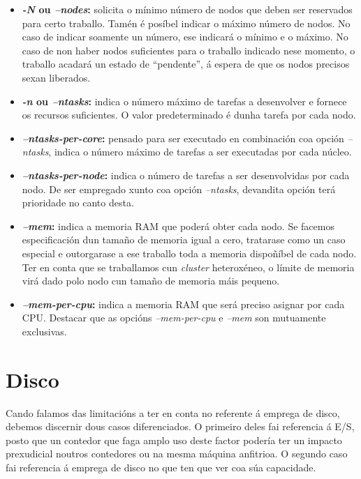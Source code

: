 \begin{itemize}
    \item \textbf{\textit{-N} ou \textit{--nodes}:} solicita o mínimo número de nodos que deben ser reservados para certo traballo. Tamén é posíbel indicar o máximo número de nodos. No caso de indicar soamente un número, ese indicará o mínimo e o máximo. No caso de non haber nodos suficientes para o traballo indicado nese momento, o traballo acadará un estado de ``pendente'', á espera de que os nodos precisos sexan liberados.
    \item \textbf{\textit{-n} ou \textit{--ntasks}:} indica o número máximo de tarefas a desenvolver e fornece os recursos suficientes. O valor predeterminado é dunha tarefa por cada nodo.
    \item \textbf{\textit{--ntasks-per-core}:} pensado para ser executado en combinación coa opción {\it --ntasks}, indica o número máximo de tarefas a ser executadas por cada núcleo.
    \item \textbf{\textit{--ntasks-per-node}:} indica o número de tarefas a ser desenvolvidas por cada nodo. De ser empregado xunto coa opción {\it --ntasks}, devandita opción terá prioridade no canto desta.
    \item \textbf{\textit{--mem}:} indica a memoria \gls{RAM} que poderá obter cada nodo. Se facemos especificación dun tamaño de memoria igual a cero, tratarase como un caso especial e outorgarase a ese traballo toda a memoria dispoñíbel de cada nodo. Ter en conta que se traballamos cun \textit{cluster} heteroxéneo, o límite de memoria virá dado polo nodo cun tamaño de memoria máis pequeno.
    \item \textbf{\textit{--mem-per-cpu}:} indica a memoria \gls{RAM} que será preciso asignar por cada CPU. Destacar que as opcións {\it --mem-per-cpu} e {\it --mem} son mutuamente exclusivas.
\end{itemize}

\section{Disco}

Cando falamos das limitacións a ter en conta no referente á emprega de disco, debemos discernir dous casos diferenciados. O primeiro deles fai referencia á E/S, posto que un contedor que faga amplo uso deste factor podería ter un impacto prexudicial noutros contedores ou na mesma máquina anfitrioa. O segundo caso fai referencia á emprega de disco no que ten que ver coa súa capacidade.\\

